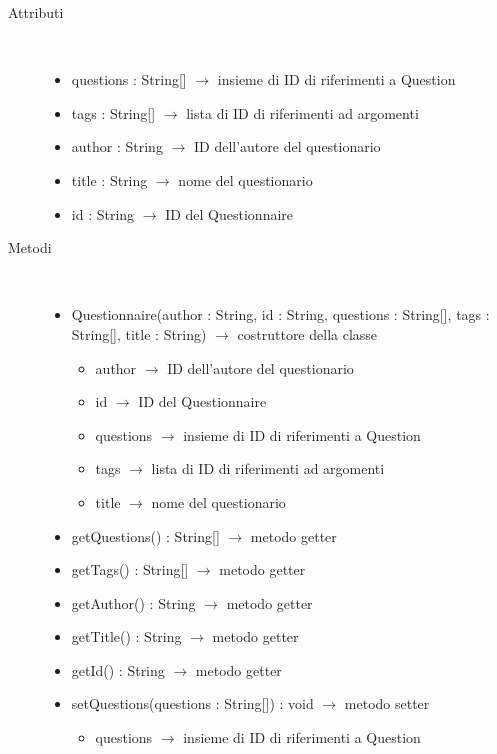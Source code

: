 \begin{description}
\item[Attributi] \hfill \\
\vspace{-7mm}
\begin{itemize}
	\item questions : String[] $\rightarrow$ insieme di ID di riferimenti a Question
	\item tags : String[] $\rightarrow$ lista di ID di riferimenti ad argomenti 
	\item author : String $\rightarrow$ ID dell'autore del questionario
	\item title : String $\rightarrow$ nome del questionario
	\item id : String $\rightarrow$ ID del Questionnaire
\end{itemize}

\item[Metodi] \hfill \\
\vspace{-7mm}
\begin{itemize}
	\item Questionnaire(author : String, id : String, questions : String[], tags : String[], title : String) $\rightarrow$ costruttore della classe\begin{itemize}
		\item author $\rightarrow$ ID dell'autore del questionario
		\item id $\rightarrow$ ID del Questionnaire
		\item questions $\rightarrow$ insieme di ID di riferimenti a Question
		\item tags $\rightarrow$ lista di ID di riferimenti ad argomenti
		\item title $\rightarrow$ nome del questionario
	\end{itemize}
	
	\item getQuestions() : String[] $\rightarrow$ metodo getter
	\item getTags() : String[] $\rightarrow$ metodo getter
	\item getAuthor() : String $\rightarrow$ metodo getter
	\item getTitle() : String $\rightarrow$ metodo getter
	\item getId() : String $\rightarrow$ metodo getter
	\item setQuestions(questions : String[]) : void $\rightarrow$ metodo setter\begin{itemize}
		\item questions $\rightarrow$ insieme di ID di riferimenti a Question
	\end{itemize}
	

\end{itemize}
\end{description}
